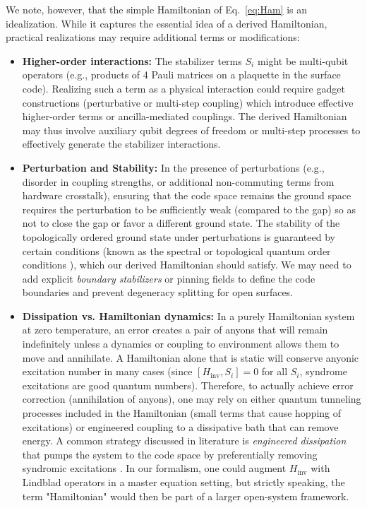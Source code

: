 \documentclass[11pt]{article}
\begin{document}
We note, however, that the simple Hamiltonian of Eq.~\eqref{eq:Ham} is an idealization. While it captures the essential idea of a derived Hamiltonian, practical realizations may require additional terms or modifications:
\begin{itemize}
    \item \textbf{Higher-order interactions:} The stabilizer terms $S_i$ might be multi-qubit operators (e.g., products of 4 Pauli matrices on a plaquette in the surface code). Realizing such a term as a physical interaction could require gadget constructions (perturbative or multi-step coupling) which introduce effective higher-order terms or ancilla-mediated couplings. The derived Hamiltonian may thus involve auxiliary qubit degrees of freedom or multi-step processes to effectively generate the stabilizer interactions.
    \item \textbf{Perturbation and Stability:} In the presence of perturbations (e.g., disorder in coupling strengths, or additional non-commuting terms from hardware crosstalk), ensuring that the code space remains the ground space requires the perturbation to be sufficiently weak (compared to the gap) so as not to close the gap or favor a different ground state. The stability of the topologically ordered ground state under perturbations is guaranteed by certain conditions (known as the spectral or topological quantum order conditions \cite{Bravyi2010}), which our derived Hamiltonian should satisfy. We may need to add explicit \emph{boundary stabilizers} or pinning fields to define the code boundaries and prevent degeneracy splitting for open surfaces.
    \item \textbf{Dissipation vs. Hamiltonian dynamics:} In a purely Hamiltonian system at zero temperature, an error creates a pair of anyons that will remain indefinitely unless a dynamics or coupling to environment allows them to move and annihilate. A Hamiltonian alone that is static will conserve anyonic excitation number in many cases (since $[H_{\mathrm{inv}}, S_i] = 0$ for all $S_i$, syndrome excitations are good quantum numbers). Therefore, to actually achieve error correction (annihilation of anyons), one may rely on either quantum tunneling processes included in the Hamiltonian (small terms that cause hopping of excitations) or engineered coupling to a dissipative bath that can remove energy. A common strategy discussed in literature is \emph{engineered dissipation} that pumps the system to the code space by preferentially removing syndromic excitations \cite{Pastawski2009, Kapit2016}. In our formalism, one could augment $H_{\mathrm{inv}}$ with Lindblad operators in a master equation setting, but strictly speaking, the term "Hamiltonian" would then be part of a larger open-system framework.
\end{itemize}
\end{document}
